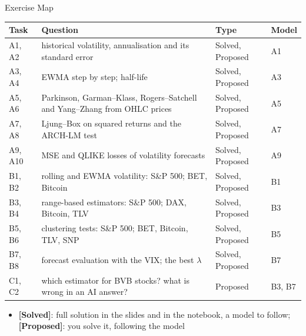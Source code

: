 \begin{frame}{Exercise Map}
\itemsize{\small}
\begin{center}
\scriptsize
\begin{tabular}{>{\raggedright\arraybackslash}p{1.1cm}>{\raggedright\arraybackslash}p{7.5cm}>{\raggedright\arraybackslash}p{1.9cm}>{\raggedright\arraybackslash}p{1.4cm}}
\toprule
\textbf{Task} & \textbf{Question} & \textbf{Type} & \textbf{Model} \\
\midrule
A1, A2 & historical volatility, annualisation and its standard error & Solved, Proposed & A1 \\
A3, A4 & EWMA step by step; half-life & Solved, Proposed & A3 \\
A5, A6 & Parkinson, Garman--Klass, Rogers--Satchell and Yang--Zhang from OHLC prices & Solved, Proposed & A5 \\
A7, A8 & Ljung--Box on squared returns and the ARCH-LM test & Solved, Proposed & A7 \\
A9, A10 & MSE and QLIKE losses of volatility forecasts & Solved, Proposed & A9 \\
B1, B2 & rolling and EWMA volatility: S\&P 500; BET, Bitcoin & Solved, Proposed & B1 \\
B3, B4 & range-based estimators: S\&P 500; DAX, Bitcoin, TLV & Solved, Proposed & B3 \\
B5, B6 & clustering tests: S\&P 500; BET, Bitcoin, TLV, SNP & Solved, Proposed & B5 \\
B7, B8 & forecast evaluation with the VIX; the best $\lambda$ & Solved, Proposed & B7 \\
C1, C2 & which estimator for BVB stocks? what is wrong in an AI answer? & Proposed & B3, B7 \\
\bottomrule
\end{tabular}
\end{center}
\begin{itemize}
    \item \textbf{[Solved]}: full solution in the slides and in the notebook, a model to follow; \textbf{[Proposed]}: you solve it, following the model
\end{itemize}
\end{frame}

